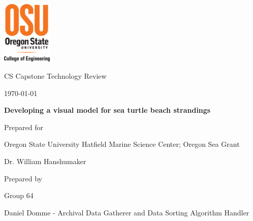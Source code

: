 \documentclass[onecolumn, draftclsnofoot,10pt, compsoc]{IEEEtran}
\def \CapstoneTeamName{		Beached Marine Critters Project Team}
\def \CapstoneTeamNumber{		64}
\def \GroupMemberOne{			Alea Weeks}
\def \GroupMemberTwo{			Amar Raad}
\def \GroupMemberThree{			Daniel Domme}
\def \GroupMemberFour{			Justin Disalvo}
\def \GroupMemberFive{			Zachary Tusing}
\def \CapstoneProjectName{		Developing a visual model for sea turtle beach strandings}
\def \CapstoneSponsorCompany{	Oregon State University Hatfield Marine Science Center; Oregon Sea Grant}
\def \CapstoneSponsorPerson{		Dr. William Hanshumaker}
\def \GroupRole{Archival Data Gatherer and Data Sorting Algorithm Handler}
\def \DocType{		%
				Technology Review
				}
\newcommand{\NameSigPair}[1]{\par
\makebox[2.75in][r]{#1} \hfil 	\makebox[3.25in]{\makebox[2.25in]{\hrulefill} \hfill		\makebox[.75in]{\hrulefill}}
\par\vspace{-12pt} \textit{\tiny\noindent
\makebox[2.75in]{} \hfil		\makebox[3.25in]{\makebox[2.25in][r]{Signature} \hfill	\makebox[.75in][r]{Date}}}}
\renewcommand{\NameSigPair}[1]{#1}
\begin{document}
\begin{titlepage}
    \begin{singlespace}
     \includegraphics[height=3cm]{coe_v_spot1}
        \hfill 
        \par\vspace{.2in}
        \centering
        \scshape{
            \huge CS Capstone \DocType \par
            {\normalsize\today}\par
            \vspace{.5in}
            \textbf{\Huge\CapstoneProjectName}\par
            \vspace{1in}
            {\Large Prepared for}\par
            \huge \CapstoneSponsorCompany\par
            \vspace{5pt}
            {\Large\NameSigPair{\CapstoneSponsorPerson}\par}
            \vspace{.5in}
            {\large Prepared by }\par
            Group\CapstoneTeamNumber\par
            \vspace{5pt}
            {\Large
                \NameSigPair{\GroupMemberThree} -
				\GroupRole\par
            }
            \vspace{20pt}
        }
        \vfill
        \begin{abstract}

\end{abstract}
\end{singlespace}
\end{titlepage}
\end{document}
